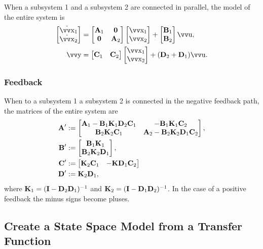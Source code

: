 When a subsystem 1 and a subsystem 2 are connected in parallel, the model of the entire system is
\begin{align*}
	\begin{bmatrix}
		\dot{\vec{x}}_1 \\ \dot{\vec{x}}_2
	\end{bmatrix}
	&=
	\begin{bmatrix}
			\mx{A}_1 & \mx{0} \\
			\mx{0} & \mx{A}_2 
	\end{bmatrix}
	\begin{bmatrix}
		\vec{x}_1 \\ \vec{x}_2
	\end{bmatrix}
	+
	\begin{bmatrix}
		\mx{B}_1 \\ \mx{B}_2
	\end{bmatrix}
	\vec{u},
	\\
	\vec{y}
	&=
	\begin{bmatrix}
		\mx{C}_1 & \mx{C}_2
	\end{bmatrix}
	\begin{bmatrix}
		\vec{x}_1 \\ \vec{x}_2
	\end{bmatrix}
	+
	(\mx{D}_2 + \mx{D}_1) \vec{u}.
\end{align*}

\subsubsection{Feedback}

When to a subsystem 1 a subsystem 2 is connected in the negative feedback path, the matrices of the entire system are
\begin{align*}
	\bm{\mathrm{A}}' &:=
	\begin{bmatrix}
		\bm{\mathrm{A}}_1 - \bm{\mathrm{B}}_1 \bm{\mathrm{K}}_1 \bm{\mathrm{D}}_2 \bm{\mathrm{C}}_1 &
		-\bm{\mathrm{B}}_1 \bm{\mathrm{K}}_1 \bm{\mathrm{C}}_2 \\
		\bm{\mathrm{B}}_2 \bm{\mathrm{K}}_2 \bm{\mathrm{C}}_1 &
		\bm{\mathrm{A}}_2 - \bm{\mathrm{B}}_2 \bm{\mathrm{K}}_2 \bm{\mathrm{D}}_1 \bm{\mathrm{C}}_2
	\end{bmatrix},
	\\
	\bm{\mathrm{B}}' &:= 
	\begin{bmatrix}
		\bm{\mathrm{B}}_1 \bm{\mathrm{K}}_1 \\ \bm{\mathrm{B}}_2 \bm{\mathrm{K}}_2 \bm{\mathrm{D}}_1
	\end{bmatrix},
	\\
	\bm{\mathrm{C}}' &:= 
	\begin{bmatrix}
		\bm{\mathrm{K}}_2 \bm{\mathrm{C}}_1 &
		-\bm{\mathrm{K}} \bm{\mathrm{D}}_1 \bm{\mathrm{C}}_2
	\end{bmatrix}
	\\
	\bm{\mathrm{D}}' &:= \bm{\mathrm{K}}_2 \bm{\mathrm{D}}_1,
\end{align*}
where \(\bm{\mathrm{K}}_1 = (\bm{\mathrm{I}} - \bm{\mathrm{D}}_2 \bm{\mathrm{D}}_1)^{-1}\) and  \(\bm{\mathrm{K}}_2 = (\bm{\mathrm{I}} - \bm{\mathrm{D}}_1 \bm{\mathrm{D}}_2)^{-1}\). In the case of a positive feedback the minus signs become pluses.

\subsection{Create a State Space Model from a Transfer Function}

